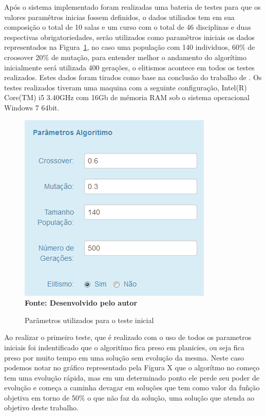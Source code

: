 \documentclass{abntpuc}
\begin{document}









\iniciocapitulo

Após o sistema implementado foram realizadas uma bateria de testes para que os valores paramêtros inicias fossem definidos, o dados utiliados tem  em sua composição o total de 10 salas e um curso com o total de 46 disciplinas e duas respectivas obrigatoriedades, serão utilizados como paramêtros iniciais os dados representados na Figura~\ref{fig:parametrosAg}, no caso uma população com 140 individuos, 60\% de croosover 20\% de mutação, para entender melhor o andamento do algorítimo inicialmente será utilizada 400 gerações, o elitismos acontece em todos os testes realizados. Estes dados foram tirados como base na conclusão do trabalho de \cite{deleonardo}. Os testes realizados tiveram uma maquina com a seguinte configuração, Intel(R) Core(TM) i5 3.40GHz com 16Gb de mémoria RAM sob o sistema operacional Windows 7 64bit.\par

\begin{figure}[!htb]
\caption[Parâmetros utilizados para o teste inicial]{Parâmetros utilizados para o teste inicial}
\label{fig:parametrosAg}
\centering
\includegraphics[scale=0.5]{imagens/parametrosDoAlgoritimo.png}
\\ \textbf{\footnotesize Fonte: Desenvolvido pelo autor}
\end{figure}

Ao realizar o primeiro teste, que é realizado com o uso de  todos os parametros iniciais foi indentificado que o algoritímo fica preso em planicies, ou seja fica preso por muito tempo em uma solução sem evolução da mesma. Neste caso podemos notar no gráfico representado pela Figura X que o algorítmo no começo tem uma evolução rápida, mas em um determinado ponto ele perde seu poder de evolução e começa a caminha devagar em soluções que tem como valor da fuñção objetiva em torno de 50\% o que não faz da solução, uma solução que atenda ao objetivo deste trabalho.
\end{document}
